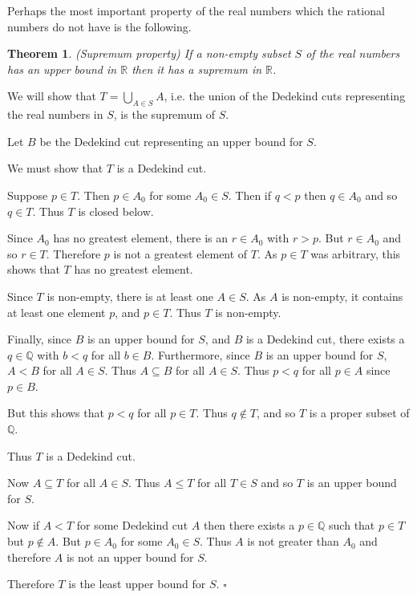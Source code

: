 \documentclass[10pt]{article}
\newcommand{\Q}{\mathbb{Q}}
\newcommand{\R}{\mathbb{R}}
\newcommand{\qed}{\square}
\newtheorem{theorem}{Theorem}[section]
\newenvironment{proof}[1][Proof]{\begin{trivlist}
\item[\hskip \labelsep {\bfseries #1}]}{\end{trivlist}}
\begin{document}
Perhaps the most important property of the real numbers which the rational numbers do not have is the following.

\begin{theorem} (Supremum property)
If a non-empty subset $S$ of the real numbers has an upper bound in $\R$ then it has a supremum in $\R$.
\end{theorem}

\begin{proof}
We will show that $T = \bigcup_{A \in S} A$, i.e. the union of the Dedekind cuts representing the real numbers in $S$, is the supremum of $S$.

Let $B$ be the Dedekind cut representing an upper bound for $S$. 

We must show that $T$ is a Dedekind cut.

Suppose $p \in T$. Then $p \in A_0$ for some $A_0 \in S$. Then if $q < p$ then $q \in A_0$ and so $q \in T$. Thus $T$ is closed below.

Since $A_0$ has no greatest element, there is an $r \in A_0$ with $r > p$. But $r \in A_0$ and so $r \in T$. Therefore $p$ is not a greatest element of $T$. As $p \in T$ was arbitrary, this shows that $T$ has no greatest element.

Since $T$ is non-empty, there is at least one $A \in S$. As $A$ is non-empty, it contains at least one element $p$, and $p \in T$. Thus $T$ is non-empty.

Finally, since $B$ is an upper bound for $S$, and $B$ is a Dedekind cut, there exists a $q \in \Q$ with $b < q$ for all $b \in B$. Furthermore, since $B$ is an upper bound for $S$, $A < B$ for all $A \in S$. Thus $A \subseteq B$ for all $A \in S$. Thus $p < q$ for all $p \in A$ since $p \in B$.

But this shows that $p < q$ for all $p \in T$. Thus $q \notin T$, and so $T$ is a proper subset of $\Q$.

Thus $T$ is a Dedekind cut.

Now $A \subseteq T$ for all $A \in S$. Thus $A \leq T$ for all $T \in S$ and so $T$ is an upper bound for $S$.

Now if $A < T$ for some Dedekind cut $A$ then there exists a $p \in \Q$ such that $p \in T$ but $p \notin A$. But $p \in A_0$ for some $A_0 \in S$. Thus $A$ is not greater than $A_0$ and therefore $A$ is not an upper bound for $S$.

Therefore $T$ is the least upper bound for $S$. $\qed$ 
\end{proof}
\end{document}
